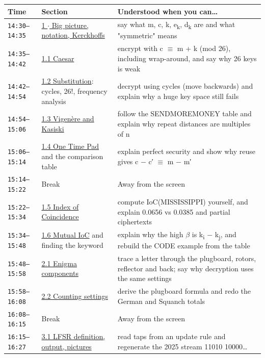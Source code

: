 \documentclass[11pt,a4paper]{article}
\begin{document}
\begin{xltabular}{\linewidth}{|l|>{\raggedright\arraybackslash}X|>{\raggedright\arraybackslash}X|}\hline
{}\textbf{Time} & \textbf{Section} & \textbf{Understood when you can\ldots{}} \\ \hline\endhead
\texttt{14:30–14:35} & \hyperref[ch1]{1 \ensuremath{\cdot} Big picture, notation, Kerckhoffs} & say what m, c, k, e\textsubscript{k}, d\textsubscript{k} are and what "symmetric" means \\ \hline
\texttt{14:35–14:42} & \hyperref[ch1]{1.1 Caesar} & encrypt with c \ensuremath{\equiv} m + k (mod 26), including wrap-around, and say why 26 keys is weak \\ \hline
\texttt{14:42–14:54} & \hyperref[ch1]{1.2 Substitution}: cycles, 26!, frequency analysis & decrypt using cycles (move backwards) and explain why a huge key space still fails \\ \hline
\texttt{14:54–15:06} & \hyperref[ch1]{1.3 Vigenère and Kasiski} & follow the SENDMOREMONEY table and explain why repeat distances are multiples of n \\ \hline
\texttt{15:06–15:14} & \hyperref[ch1]{1.4 One Time Pad} and the comparison table & explain perfect security and show why reuse gives c \ensuremath{-} c′ \ensuremath{\equiv} m \ensuremath{-} m′ \\ \hline
\texttt{15:14–15:22} & Break & Away from the screen \\ \hline
\texttt{15:22–15:34} & \hyperref[ch1-ioc]{1.5 Index of Coincidence} & compute IoC(MISSISSIPPI) yourself, and explain 0.0656 vs 0.0385 and partial ciphertexts \\ \hline
\texttt{15:34–15:48} & \hyperref[ch1-ioc]{1.6 Mutual IoC} and finding the keyword & explain why the high \ensuremath{\beta} is k\textsubscript{i} \ensuremath{-} k\textsubscript{j}, and rebuild the CODE example from the table \\ \hline
\texttt{15:48–15:58} & \hyperref[ch2]{2.1 Enigma components} & trace a letter through the plugboard, rotors, reflector and back; say why decryption uses the same settings \\ \hline
\texttt{15:58–16:08} & \hyperref[ch2]{2.2 Counting settings} & derive the plugboard formula and redo the German and Squanch totals \\ \hline
\texttt{16:08–16:15} & Break & Away from the screen \\ \hline
\texttt{16:15–16:27} & \hyperref[ch3]{3.1 LFSR definition, output, pictures} & read taps from an update rule and regenerate the 2025 stream 11010 10000\ldots{} \\ \hline

\end{xltabular}
\end{document}
